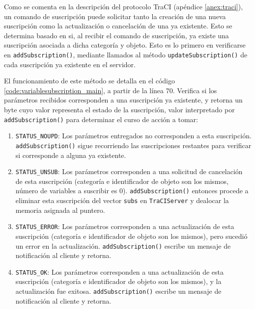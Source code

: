 Como se comenta en la descripción del protocolo TraCI (apéndice \ref{anex:traci}), un comando de suscripción puede solicitar tanto la creación de una nueva suscripción como la actualización o cancelación de una ya existente. Esto se determina basado en si, al recibir el comando de suscripción, ya existe una suscripción asociada a dicha categoría y objeto. Esto es lo primero en verificarse en \texttt{addSubscription()}, mediante llamados al método \texttt{updateSubscription()} de cada suscripción ya existente en el servidor.

El funcionamiento de este método se detalla en el código \ref{code:variablesubscription_main}, a partir de la línea 70. Verifica si los parámetros recibidos corresponden a una suscripción ya existente, y retorna un byte cuyo valor representa el estado de la suscripción, valor interpretado por \texttt{addSubscription()} para determinar el curso de acción a tomar:
\begin{enumerate}
    \item \texttt{STATUS\_NOUPD}: Los parámetros entregados no corresponden a esta suscripción. \texttt{addSubscription()} sigue recorriendo las suscripciones restantes para verificar si corresponde a alguna ya existente.
    \item \texttt{STATUS\_UNSUB}: Los parámetros corresponden a una solicitud de cancelación de esta suscripción (categoría e identificador de objeto son los mismos, número de variables a suscribir es $0$). \texttt{addSubscription()} entonces procede a eliminar esta suscripción del vector \texttt{subs} en \texttt{TraCIServer} y dealocar la memoria asignada al puntero.
    \item \texttt{STATUS\_ERROR}: Los parámetros corresponden a una actualización de esta suscripción (categoría e identificador de objeto son los mismos), pero sucedió un error en la actualización. \texttt{addSubscription()} escribe un mensaje de notificación al cliente y retorna.
    \item \texttt{STATUS\_OK}: Los parámetros corresponden a una actualización de esta suscripción (categoría e identificador de objeto son los mismos), y la actualización fue exitosa. \texttt{addSubscription()} escribe un mensaje de notificación al cliente y retorna.
\end{enumerate}




